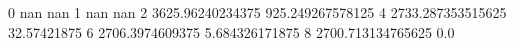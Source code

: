0 nan nan
1 nan nan
2 3625.96240234375 925.249267578125
4 2733.287353515625 32.57421875
6 2706.3974609375 5.684326171875
8 2700.713134765625 0.0
